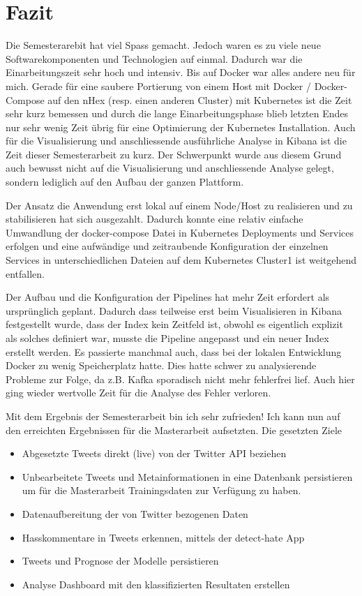 \chapter{Fazit}
\label{chap:fazit}
Die Semesterarebit hat viel Spass gemacht. Jedoch waren es zu viele neue Softwarekomponenten und Technologien auf einmal. Dadurch war die Einarbeitungszeit sehr hoch und intensiv. Bis auf Docker war alles andere neu f{\"u}r mich. Gerade f{\"u}r  eine saubere Portierung von einem Host mit Docker / Docker-Compose auf den nHex (resp. einen anderen Cluster) mit Kubernetes ist die Zeit sehr kurz bemessen und durch die lange Einarbeitungsphase blieb letzten Endes nur sehr wenig Zeit {\"u}brig f{\"u}r eine Optimierung der Kubernetes Installation. Auch f{\"u}r die Visualisierung und anschliessende ausf{\"u}hrliche Analyse in Kibana ist die Zeit dieser Semesterarbeit zu kurz. Der Schwerpunkt wurde aus diesem Grund auch bewusst nicht auf die Visualisierung und anschliessende Analyse gelegt, sondern lediglich auf den Aufbau der ganzen Plattform. 

Der Ansatz die Anwendung erst lokal auf einem Node/Host zu realisieren und zu stabilisieren hat sich ausgezahlt. Dadurch konnte eine relativ einfache Umwandlung der docker-compose Datei in Kubernetes Deployments und Services erfolgen und eine aufw{\"a}ndige und zeitraubende Konfiguration der einzelnen Services in unterschiedlichen Dateien auf dem Kubernetes Cluster1 ist weitgehend entfallen.

Der Aufbau und die Konfiguration der Pipelines hat mehr Zeit erfordert als urspr{\"u}nglich geplant. Dadurch dass teilweise erst beim Visualisieren in Kibana festgestellt wurde, dass der Index kein Zeitfeld ist, obwohl es eigentlich explizit als solches definiert war, musste die Pipeline angepasst und ein neuer Index erstellt werden. Es passierte manchmal auch, dass bei der lokalen Entwicklung Docker zu wenig Speicherplatz hatte. Dies hatte schwer zu analysierende Probleme zur Folge, da z.B. Kafka sporadisch nicht mehr fehlerfrei lief. Auch hier ging wieder wertvolle Zeit f{\"u}r die Analyse des Fehler verloren. 

Mit dem Ergebnis der Semesterarbeit bin ich sehr zufrieden! Ich kann nun auf den erreichten Ergebnissen f{\"u}r die Masterarbeit aufsetzten. Die gesetzten Ziele 

\begin{itemize}
\item Abgesetzte Tweets direkt (live) von der Twitter API beziehen
\item Unbearbeitete Tweets und Metainformationen in eine Datenbank persistieren um f{\"u}r die Masterarbeit Trainingsdaten zur Verf{\"u}gung zu haben.  
\item Datenaufbereitung der von Twitter bezogenen Daten
\item Hasskommentare in Tweets erkennen, mittels der detect-hate App
\item Tweets und Prognose der Modelle persistieren
\item Analyse Dashboard mit den klassifizierten Resultaten erstellen
\end{itemize}

